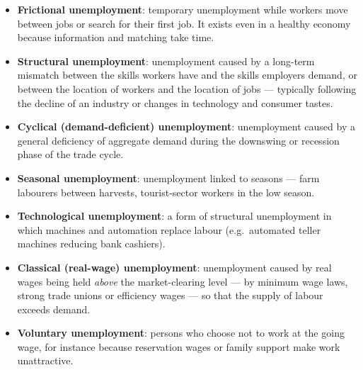 \documentclass[11pt]{article}
\begin{document}
\begin{definition}
\begin{itemize}
\item \textbf{Frictional unemployment}: temporary unemployment while workers move between jobs or search for their first job. It exists even in a healthy economy because information and matching take time.
\item \textbf{Structural unemployment}: unemployment caused by a long-term mismatch between the skills workers have and the skills employers demand, or between the location of workers and the location of jobs — typically following the decline of an industry or changes in technology and consumer tastes.
\item \textbf{Cyclical (demand-deficient) unemployment}: unemployment caused by a general deficiency of aggregate demand during the downswing or recession phase of the trade cycle.
\item \textbf{Seasonal unemployment}: unemployment linked to seasons — farm labourers between harvests, tourist-sector workers in the low season.
\item \textbf{Technological unemployment}: a form of structural unemployment in which machines and automation replace labour (e.g.\ automated teller machines reducing bank cashiers).
\item \textbf{Classical (real-wage) unemployment}: unemployment caused by real wages being held \emph{above} the market-clearing level — by minimum wage laws, strong trade unions or efficiency wages — so that the supply of labour exceeds demand.
\item \textbf{Voluntary unemployment}: persons who choose not to work at the going wage, for instance because reservation wages or family support make work unattractive.
\end{itemize}
\end{definition}
\end{document}
